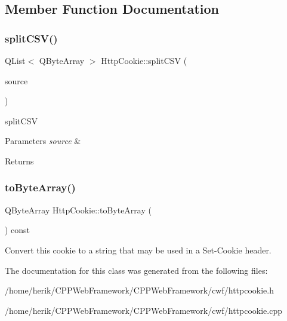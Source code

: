 \subsection{Member Function Documentation}
\mbox{\label{class_http_cookie_a3f086e32413e23fdab53ffefa70b8b0e}} 
\subsubsection{\texorpdfstring{split\+C\+S\+V()}{splitCSV()}}
{\footnotesize\ttfamily Q\+List$<$ Q\+Byte\+Array $>$ Http\+Cookie\+::split\+C\+SV (\begin{DoxyParamCaption}\item[{const Q\+Byte\+Array \&}]{source }\end{DoxyParamCaption})\hspace{0.3cm}{\ttfamily [static]}}



split\+C\+SV 


\begin{DoxyParams}{Parameters}
{\em source} & \\
\hline
\end{DoxyParams}
\begin{DoxyReturn}{Returns}

\end{DoxyReturn}
\mbox{\label{class_http_cookie_aef937847dbebf7290e94b94afbb8f9a1}} 
\subsubsection{\texorpdfstring{to\+Byte\+Array()}{toByteArray()}}
{\footnotesize\ttfamily Q\+Byte\+Array Http\+Cookie\+::to\+Byte\+Array (\begin{DoxyParamCaption}{ }\end{DoxyParamCaption}) const}

Convert this cookie to a string that may be used in a Set-\/\+Cookie header. 

The documentation for this class was generated from the following files\+:\begin{DoxyCompactItemize}
\item 
/home/herik/\+C\+P\+P\+Web\+Framework/\+C\+P\+P\+Web\+Framework/cwf/httpcookie.\+h\item 
/home/herik/\+C\+P\+P\+Web\+Framework/\+C\+P\+P\+Web\+Framework/cwf/httpcookie.\+cpp\end{DoxyCompactItemize}
